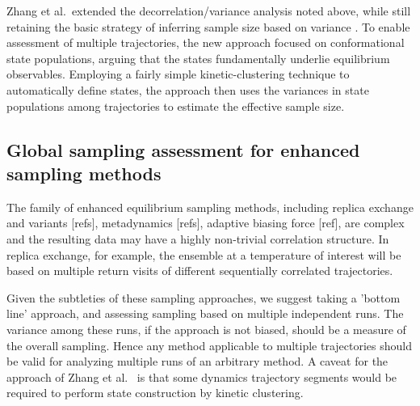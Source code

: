 Zhang et al.\ extended the decorrelation/variance analysis noted above, while still retaining the basic strategy of inferring sample size based on variance \cite{Zhang2010}.
To enable assessment of multiple trajectories, the new approach focused on conformational state populations, arguing that the states fundamentally underlie equilibrium observables.
Employing a fairly simple kinetic-clustering technique to automatically define states, the approach then uses the variances in state populations among trajectories to estimate the effective sample size.


\subsection{Global sampling assessment for enhanced sampling methods}
The family of enhanced equilibrium sampling methods, including replica exchange and variants [refs], metadynamics [refs], adaptive biasing force [ref], are complex and the resulting data may have a highly non-trivial correlation structure.
In replica exchange, for example, the ensemble at a temperature of interest will be based on multiple return visits of different sequentially correlated trajectories.

Given the subtleties of these sampling approaches, we suggest taking a 'bottom line' approach, and assessing sampling based on multiple independent runs.
The variance among these runs, if the approach is not biased, should be a measure of the overall sampling.
Hence any method applicable to multiple trajectories should be valid for analyzing multiple runs of an arbitrary method.
A caveat for the approach of Zhang et al.\ \cite{Zhang2010} is that some dynamics trajectory segments would be required to perform state construction by kinetic clustering.

